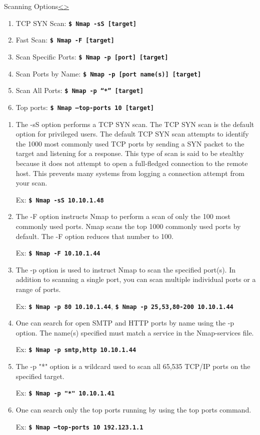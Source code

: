 \documentclass[12pt]{extarticle}
\newcommand{\code}[1]{\texttt{\bfseries#1}}
\newenvironment{instructionblock}{\Large\bgroup}{\egroup}
\begin{document}
\pagebreak
\begin{slide}{Scanning Options}{\hyperref[slide 8]{\textless}\hyperref[slide 10]{\textgreater}}
\begin{instructionblock}
\begin{enumerate}
	\item TCP SYN Scan: \code{\$ Nmap -sS [target]}
	\item Fast Scan: \code{\$ Nmap -F [target]}
	\item Scan Specific Ports: \code{\$ Nmap -p [port] [target]}
	\item Scan Ports by Name: \code{\$ Nmap -p [port name(s)] [target]}
	\item Scan All Ports: \code{\$ Nmap -p “*” [target]}
	\item Top ports: \code{\$ Nmap --top-ports 10 [target]}
\end{enumerate}
\end{instructionblock}
\end{slide}
\begin{enumerate}
\item The -sS option performs a TCP SYN scan. The TCP SYN scan is the default option for privileged users. The default TCP SYN scan attempts to identify the 1000 most commonly used TCP ports by sending a SYN packet to the target and listening for a response. This type of scan is said to be stealthy because it does not attempt to open a full-fledged connection to the remote host. This prevents many systems from logging a connection attempt from your scan.\cite{cookbook}

Ex: \code{\$ Nmap -sS 10.10.1.48}

\item The -F option instructs Nmap to perform a scan of only the 100 most commonly used ports. Nmap scans the top 1000 commonly used ports by default. The -F option reduces that number to 100.\cite{cookbook}

Ex: \code{\$ Nmap -F 10.10.1.44}

\item The -p option is used to instruct Nmap to scan the specified port(s). In addition to scanning a single port, you can scan multiple individual ports or a range of ports.\cite{cookbook}

Ex: \code{\$ Nmap -p 80 10.10.1.44}, \code{\$ Nmap -p 25,53,80-200 10.10.1.44}


\item One can search for open SMTP and HTTP ports by name using the -p option. The name(s) specified must match a service in the Nmap-services file.\cite{cookbook}

Ex: \code{\$ Nmap -p smtp,http 10.10.1.44}

\item The -p "*" option is a wildcard used to scan all 65,535 TCP/IP ports on the specified target.\cite{cookbook} 

Ex: \code{\$ Nmap -p "*" 10.10.1.41}

\item One can search only the top ports running by using the top ports command.\cite{cookbook}

Ex: \code{\$ Nmap --top-ports 10 192.123.1.1 }
\end{enumerate}
\end{document}

